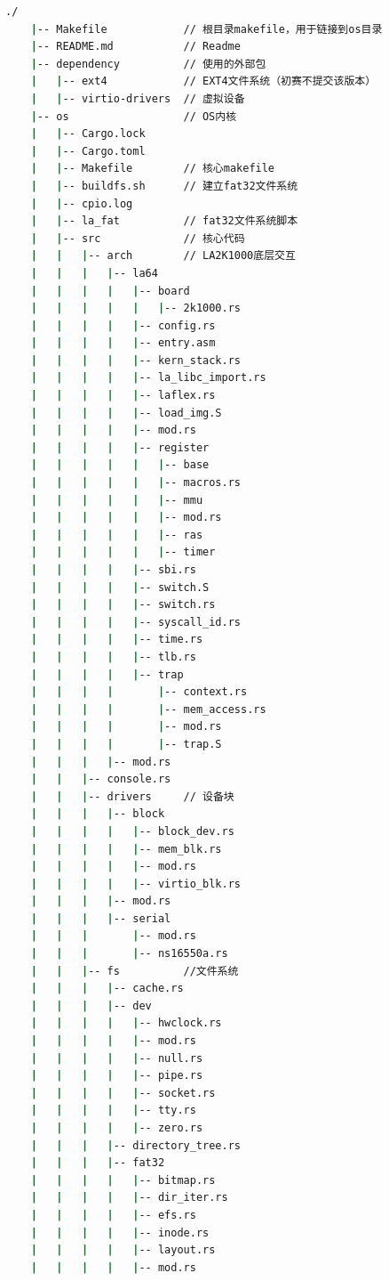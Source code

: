 \begin{lstlisting}[language={bash}, label={code:content},
	caption={目录树}]
    ./
    |-- Makefile            // 根目录makefile，用于链接到os目录
    |-- README.md           // Readme
    |-- dependency          // 使用的外部包
    |   |-- ext4            // EXT4文件系统（初赛不提交该版本）
    |   |-- virtio-drivers  // 虚拟设备
    |-- os                  // OS内核
    |   |-- Cargo.lock
    |   |-- Cargo.toml
    |   |-- Makefile        // 核心makefile
    |   |-- buildfs.sh      // 建立fat32文件系统
    |   |-- cpio.log
    |   |-- la_fat          // fat32文件系统脚本
    |   |-- src             // 核心代码
    |   |   |-- arch        // LA2K1000底层交互
    |   |   |   |-- la64
    |   |   |   |   |-- board
    |   |   |   |   |   |-- 2k1000.rs
    |   |   |   |   |-- config.rs
    |   |   |   |   |-- entry.asm
    |   |   |   |   |-- kern_stack.rs
    |   |   |   |   |-- la_libc_import.rs
    |   |   |   |   |-- laflex.rs
    |   |   |   |   |-- load_img.S
    |   |   |   |   |-- mod.rs
    |   |   |   |   |-- register
    |   |   |   |   |   |-- base
    |   |   |   |   |   |-- macros.rs
    |   |   |   |   |   |-- mmu
    |   |   |   |   |   |-- mod.rs
    |   |   |   |   |   |-- ras
    |   |   |   |   |   |-- timer
    |   |   |   |   |-- sbi.rs
    |   |   |   |   |-- switch.S
    |   |   |   |   |-- switch.rs
    |   |   |   |   |-- syscall_id.rs
    |   |   |   |   |-- time.rs
    |   |   |   |   |-- tlb.rs
    |   |   |   |   |-- trap
    |   |   |   |       |-- context.rs
    |   |   |   |       |-- mem_access.rs
    |   |   |   |       |-- mod.rs
    |   |   |   |       |-- trap.S
    |   |   |   |-- mod.rs
    |   |   |-- console.rs
    |   |   |-- drivers     // 设备块
    |   |   |   |-- block
    |   |   |   |   |-- block_dev.rs
    |   |   |   |   |-- mem_blk.rs
    |   |   |   |   |-- mod.rs
    |   |   |   |   |-- virtio_blk.rs
    |   |   |   |-- mod.rs
    |   |   |   |-- serial
    |   |   |       |-- mod.rs
    |   |   |       |-- ns16550a.rs
    |   |   |-- fs          //文件系统
    |   |   |   |-- cache.rs
    |   |   |   |-- dev
    |   |   |   |   |-- hwclock.rs
    |   |   |   |   |-- mod.rs
    |   |   |   |   |-- null.rs
    |   |   |   |   |-- pipe.rs
    |   |   |   |   |-- socket.rs
    |   |   |   |   |-- tty.rs
    |   |   |   |   |-- zero.rs
    |   |   |   |-- directory_tree.rs
    |   |   |   |-- fat32
    |   |   |   |   |-- bitmap.rs
    |   |   |   |   |-- dir_iter.rs
    |   |   |   |   |-- efs.rs
    |   |   |   |   |-- inode.rs
    |   |   |   |   |-- layout.rs
    |   |   |   |   |-- mod.rs

\end{lstlisting}
